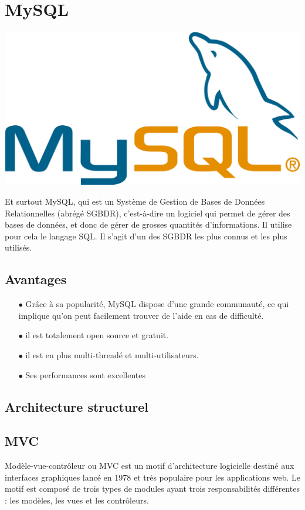 			\section*{MySQL}
			\begin{center}
				\includegraphics[scale=0.2]{chap_2/mysql.png}
				\label{logo de MySQL}
				\cite{logo_mysql}
			\end{center}
			Et surtout MySQL, qui est un Système de Gestion de Bases de Données Relationnelles (abrégé SGBDR), c'est-à-dire un logiciel qui permet de gérer des bases de données, et donc de gérer de grosses quantités d'informations. Il utilise pour cela le langage SQL. Il s'agit d'un des SGBDR les plus connus et les plus utilisés.
			\subsection{Avantages}
				\begin{itemize}
					\item[$\bullet$] Grâce à sa popularité, MySQL dispose d'une grande communauté, ce qui implique qu'on peut facilement trouver de l'aide en cas de difficulté.
					\item[$\bullet$] il est totalement open source et gratuit.
					\item[$\bullet$] il est en plus multi-threadé et multi-utilisateurs.
					\item[$\bullet$] Ses performances sont excellentes
				\end{itemize}
			
		\subsection{Architecture structurel}
		\subsection*{MVC}
			Modèle-vue-contrôleur ou MVC est un motif d'architecture logicielle destiné aux interfaces graphiques lancé en 1978 et très populaire pour les applications web. Le motif est composé de trois types de modules ayant trois responsabilités différentes : les modèles, les vues et les contrôleurs.
				
